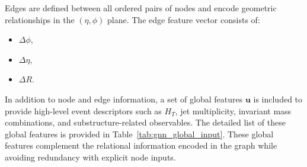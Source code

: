 Edges are defined between all ordered pairs of nodes and encode geometric relationships in the $(\eta,\phi)$ plane. 
The edge feature vector consists of:
\begin{itemize}
    \item $\Delta\phi$,
    \item $\Delta\eta$,
    \item $\Delta R$.
\end{itemize}

In addition to node and edge information, a set of global features $\mathbf{u}$ is included to provide high-level event descriptors such as $H_T$, jet multiplicity, invariant mass combinations, and substructure-related observables. 
The detailed list of these global features is provided in Table~\ref{tab:gnn_global_input}. These global features complement the relational information encoded in the graph while avoiding redundancy with explicit node inputs.

